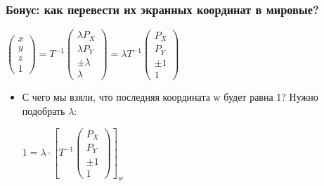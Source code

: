 \documentclass{beamer}
\begin{document}
\begin{frame}[fragile]
\frametitle{Бонус: как перевести их экранных координат в мировые?}
\begin{center}
\begin{math}
\begin{pmatrix}x \\ y \\ z \\ 1\end{pmatrix} = T^{-1} \begin{pmatrix}\lambda P_X \\ \lambda P_Y \\ \pm \lambda \\ \lambda\end{pmatrix} = \lambda T^{-1} \begin{pmatrix}P_X \\ P_Y \\ \pm 1 \\ 1\end{pmatrix}
\end{math}
\end{center}
\pause
\begin{itemize}
\item С чего мы взяли, что последняя координата w будет равна 1? \pause Нужно подобрать \begin{math}\lambda\end{math}:
\begin{center}
\begin{math}
1 = \lambda \cdot
\left[
T^{-1} \begin{pmatrix}P_X \\ P_Y \\ \pm 1 \\ 1\end{pmatrix}
\right]_w
\end{math}
\end{center}
\end{itemize}
\end{frame}
\end{document}
